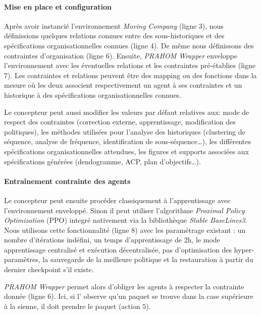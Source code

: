 \documentclass[demonstration]{jfsma}
\newcounter{relation}
\begin{document}
\paragraph{Mise en place et configuration}

Après avoir instancié l'environnement \emph{Moving Company} (ligne 3), nous définissions quelques relations connues entre des sous-historiques et des spécifications organisationnelles connues (ligne 4). De même nous définissons des contraintes d'organisation (ligne 6). Ensuite, \emph{PRAHOM Wrapper} enveloppe l'environnement avec les éventuelles relations et les contraintes pré-établies (ligne 7). Les contraintes et relations peuvent être des mapping ou des fonctions dans la mesure où les deux associent respectivement un agent à ses contraintes et un historique à des spécifications organisationnelles connues.

Le concepteur peut aussi modifier les valeurs par défaut relatives aux: mode de respect des contraintes (correction externe, apprentissage, modification des politiques), les méthodes utilisées pour l'analyse des historiques (clustering de séquence, analyse de fréquence, identification de sous-séquence\dots), les différentes spécifications organisationnelles attendues, les figures et supports associées aux spécifications générées (dendogramme, ACP, plan d'objectifs\dots).

\paragraph{Entraînement contrainte des agents}

Le concepteur peut ensuite procéder classiquement à l'apprentissage avec l'environnement enveloppé. Sinon il peut utiliser l'algorithme \emph{Proximal Policy Optimization} (PPO) integré nativement via la bibliothèque \emph{Stable BaseLines3}. Nous utilisons cette fonctionnalité (ligne 8) avec les paramétrage existant  : un nombre d'itérations indéfini, un temps d'apprentissage de 2h, le mode apprentissage centralisé et exécution décentralisée, pas d'optimisation des hyper-paramètres, la sauvegarde de la meilleure politique et la restauration à partir du dernier checkpoint s'il existe.

\emph{PRAHOM Wrapper} permet alors d'obliger les agents à respecter la contrainte donnée (ligne 6). Ici, si l' observe qu'un paquet se trouve dans la case supérieure à la sienne, il doit prendre le paquet (action $5$).
\end{document}
